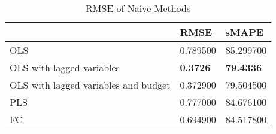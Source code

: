 \begin{table}[h!]
\centering
\caption{RMSE of Naive Methods}
\label{naive_rmse}
\begin{tabular}{lll}
\toprule
 & RMSE & sMAPE \\
\midrule
OLS & 0.789500 & 85.299700 \\
OLS with lagged variables & \textbf{0.3726} & \textbf{79.4336} \\
OLS with lagged variables and budget & 0.372900 & 79.504500 \\
PLS & 0.777000 & 84.676100 \\
FC & 0.694900 & 84.517800 \\
\bottomrule
\end{tabular}
\end{table}
